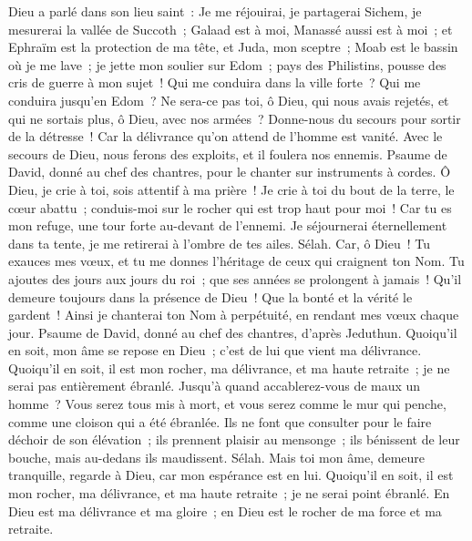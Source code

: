 \begin{multicols}{2}
Dieu a parlé dans son lieu saint~: Je me réjouirai, je partagerai Sichem, je mesurerai la vallée de Succoth~;
Galaad est à moi, Manassé aussi est à moi~; et Ephraïm est la protection de ma tête, et Juda, mon sceptre~;
Moab est le bassin où je me lave~; je jette mon soulier sur Edom~; pays des Philistins, pousse des cris de guerre à mon sujet~!
Qui me conduira dans la ville forte~? Qui me conduira jusqu'en Edom~?
Ne sera-ce pas toi, ô Dieu, qui nous avais rejetés, et qui ne sortais plus, ô Dieu, avec nos armées~?
Donne-nous du secours pour sortir de la détresse~! Car la délivrance qu'on attend de l'homme est vanité.
Avec le secours de Dieu, nous ferons des exploits, et il foulera nos ennemis.
\VerseOne{}Psaume de David, donné au chef des chantres, pour le chanter sur instruments à cordes.
Ô Dieu, je crie à toi, sois attentif à ma prière~!
Je crie à toi du bout de la terre, le cœur abattu~; conduis-moi sur le rocher qui est trop haut pour moi~!
Car tu es mon refuge, une tour forte au-devant de l'ennemi.
Je séjournerai éternellement dans ta tente, je me retirerai à l'ombre de tes ailes. Sélah.
Car, ô Dieu~! Tu exauces mes vœux, et tu me donnes l'héritage de ceux qui craignent ton Nom.
Tu ajoutes des jours aux jours du roi~; que ses années se prolongent à jamais~!
Qu'il demeure toujours dans la présence de Dieu~! Que la bonté et la vérité le gardent~!
Ainsi je chanterai ton Nom à perpétuité, en rendant mes vœux chaque jour.
\VerseOne{}Psaume de David, donné au chef des chantres, d'après Jeduthun.
Quoiqu'il en soit, mon âme se repose en Dieu~; c'est de lui que vient ma délivrance.
Quoiqu'il en soit, il est mon rocher, ma délivrance, et ma haute retraite~; je ne serai pas entièrement ébranlé.
Jusqu'à quand accablerez-vous de maux un homme~? Vous serez tous mis à mort, et vous serez comme le mur qui penche, comme une cloison qui a été ébranlée.
Ils ne font que consulter pour le faire déchoir de son élévation~; ils prennent plaisir au mensonge~; ils bénissent de leur bouche, mais au-dedans ils maudissent. Sélah.
Mais toi mon âme, demeure tranquille, regarde à Dieu, car mon espérance est en lui.
Quoiqu'il en soit, il est mon rocher, ma délivrance, et ma haute retraite~; je ne serai point ébranlé.
En Dieu est ma délivrance et ma gloire~; en Dieu est le rocher de ma force et ma retraite.

\end{multicols}
